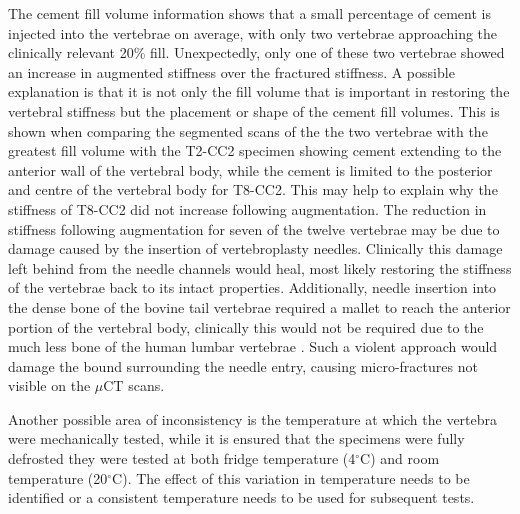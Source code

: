 The cement fill volume information shows that a small percentage of cement is
injected into the vertebrae on average, with only two vertebrae approaching the
clinically relevant 20\% fill.  Unexpectedly, only one of these two vertebrae
showed an increase in augmented stiffness over the fractured stiffness.  A
possible explanation is that it is not only the fill volume that is important
in restoring the vertebral stiffness but the placement or shape of the cement
fill volumes.  This is shown when comparing the segmented scans of the the two
vertebrae with the greatest fill volume with the T2-CC2 specimen showing cement
extending to the anterior wall of the vertebral body, while the cement is
limited to the posterior and centre of the vertebral body for T8-CC2.  This may
help to explain why the stiffness of T8-CC2 did not increase following
augmentation.  The reduction in stiffness following augmentation for seven of
the twelve vertebrae may be due to damage caused by the insertion of
vertebroplasty needles.  Clinically this damage left behind from the needle
channels would heal, most likely restoring the stiffness of the vertebrae back
to its intact properties. Additionally, needle insertion into the dense bone of
the bovine tail vertebrae required a mallet to reach the anterior portion of
the vertebral body, clinically this would not be required due to the much less
bone of the human lumbar vertebrae
\cite{aerssens_jeroen_boonen_steven_geert_dequeker_1998}. Such a
violent approach would damage the bound surrounding the needle entry, causing
micro-fractures not visible on the $\mu$CT scans.

Another possible area of inconsistency is the temperature at which the vertebra
were mechanically tested, while it is ensured that the specimens were fully
defrosted they were tested at both fridge temperature (4$^\circ$C) and room
temperature (20$^\circ$C).  The effect of this variation in temperature needs
to be identified or a consistent temperature needs to be used for subsequent
tests.

